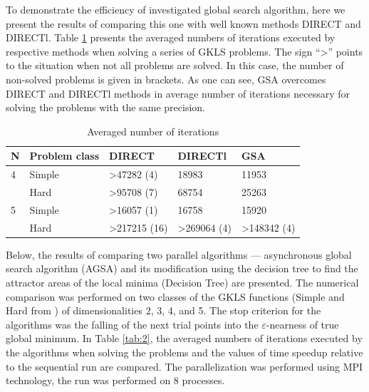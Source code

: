 \documentclass{svproc}
\begin{document}
To demonstrate the efficiency of  investigated global search algorithm, here we present the results of  comparing this one with well known methods DIRECT and DIRECTl. Table \ref{tab:1} presents the averaged numbers of iterations executed by respective methods when  solving a series of GKLS problems. The sign ``>'' points to the situation when not all problems are  solved. In this case, the number of non-solved problems is given in brackets. As one can see,  GSA overcomes DIRECT and DIRECTl methods in average number of iterations necessary for solving the problems with the same precision.

\begin{table}[!ht]
    \caption{Averaged number of iterations}
    \label{tab:1}
    \centering
    \begin{tabular}{|l|l|l|l|l|}
    \hline
        N & Problem class & DIRECT & DIRECTl & GSA  \\ \hline
        4 & Simple & >47282 (4) & 18983 & 11953  \\ \hline
        ~ & Hard & >95708 (7) & 68754 & 25263  \\ \hline
        5 & Simple & >16057 (1) & 16758 & 15920  \\ \hline
        ~ & Hard & >217215 (16) & >269064 (4) & >148342 (4)  \\ \hline
    \end{tabular}
\end{table}




Below, the results of comparing two parallel algorithms --- asynchronous global search algorithm  (AGSA) and its modification using the decision tree to find the attractor areas of the local minima  (Decision Tree) are presented. The numerical comparison was performed on two classes of the GKLS  functions (Simple and Hard from \cite{fio_bib19}) of dimensionalities 2, 3, 4, and 5. The stop  criterion for the algorithms was the falling of the next trial points into the $\varepsilon$-nearness of  true global minimum.  In Table \ref{tab:2}, the averaged numbers of iterations executed by the algorithms when solving the  problems and the values of time speedup relative to the sequential run are compared. The parallelization was performed using MPI technology, the run was performed on 8 processes.
\end{document}
